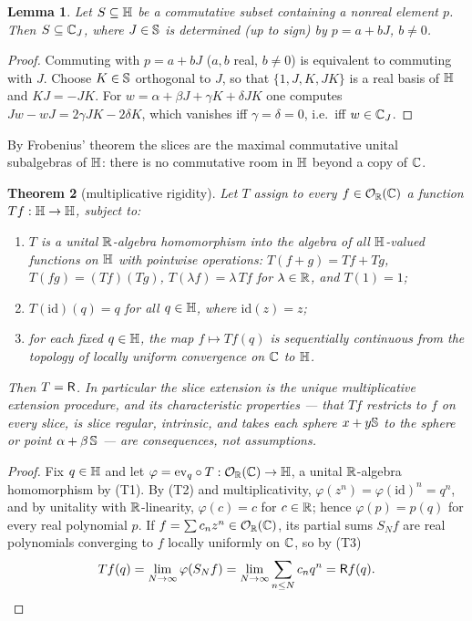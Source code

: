 \documentclass[11pt]{amsart}
\newtheorem{theorem}{Theorem}[section]
\newtheorem{lemma}[theorem]{Lemma}
\theoremstyle{definition}
\theoremstyle{remark}
\begin{document}
\begin{lemma}\label{lem:commutant}
Let $S\subseteq\mathbb{H}$ be a commutative subset containing a nonreal element
$p$.  Then $S\subseteq\mathbb{C}_J$, where $J\in\mathbb{S}$ is determined (up to sign)
by $p=a+bJ$, $b\neq0$.
\end{lemma}

\begin{proof}
Commuting with $p=a+bJ$ ($a,b$ real, $b\neq0$) is equivalent to commuting
with $J$.  Choose $K\in\mathbb{S}$ orthogonal to $J$, so that $\{1,J,K,JK\}$ is a
real basis of $\mathbb{H}$ and $KJ=-JK$.  For
$w=\alpha+\beta J+\gamma K+\delta JK$ one computes
$Jw-wJ=2\gamma JK-2\delta K$, which vanishes iff $\gamma=\delta=0$, i.e.\
iff $w\in\mathbb{C}_J$.
\end{proof}

By Frobenius' theorem the slices are the maximal commutative unital
subalgebras of $\mathbb{H}$: there is no commutative room in $\mathbb{H}$ beyond a copy
of $\mathbb{C}$.

\begin{theorem}[multiplicative rigidity]\label{thm:mult}
Let $T$ assign to every $f\in\mathcal{O}_{\mathbb{R}}(\mathbb{C})$ a function $Tf:\mathbb{H}\to\mathbb{H}$, subject to:
\begin{enumerate}
\item[\textup{(T1)}] $T$ is a unital $\mathbb{R}$-algebra homomorphism into the
algebra of all $\mathbb{H}$-valued functions on $\mathbb{H}$ with \emph{pointwise}
operations: $T(f+g)=Tf+Tg$, $T(fg)=(Tf)(Tg)$, $T(\lambda f)=\lambda\,Tf$
for $\lambda\in\mathbb{R}$, and $T(1)=1$;
\item[\textup{(T2)}] $T(\mathrm{id})(q)=q$ for all $q\in\mathbb{H}$, where
$\mathrm{id}(z)=z$;
\item[\textup{(T3)}] for each fixed $q\in\mathbb{H}$, the map $f\mapsto Tf(q)$ is
sequentially continuous from the topology of locally uniform convergence
on $\mathbb{C}$ to $\mathbb{H}$.
\end{enumerate}
Then $T=\mathsf{R}$.  In particular the slice extension is the unique
multiplicative extension procedure, and its characteristic properties ---
that $Tf$ restricts to $f$ on every slice, is slice regular, intrinsic,
and takes each sphere $x+y\mathbb{S}$ to the sphere or point
$\alpha+\beta\,\mathbb{S}$ --- are consequences, not assumptions.
\end{theorem}

\begin{proof}
Fix $q\in\mathbb{H}$ and let $\varphi=\mathrm{ev}_q\circ T:\mathcal{O}_{\mathbb{R}}(\mathbb{C})\to\mathbb{H}$, a unital
$\mathbb{R}$-algebra homomorphism by (T1).  By (T2) and multiplicativity,
$\varphi(z^n)=\varphi(\mathrm{id})^n=q^n$, and by unitality with
$\mathbb{R}$-linearity, $\varphi(c)=c$ for $c\in\mathbb{R}$; hence $\varphi(p)=p(q)$ for
every real polynomial $p$.  If $f=\sum c_nz^n\in\mathcal{O}_{\mathbb{R}}(\mathbb{C})$, its partial sums
$S_Nf$ are real polynomials converging to $f$ locally uniformly on $\mathbb{C}$,
so by (T3)
\[
Tf(q)=\lim_{N\to\infty}\varphi(S_Nf)=\lim_{N\to\infty}\sum_{n\le N}c_nq^n
=\mathsf{R} f(q).\qedhere
\]
\end{proof}
\end{document}
